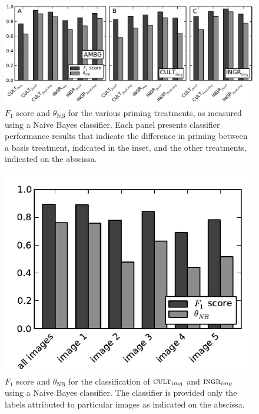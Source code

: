 \documentclass[a4paper]{report}
\begin{document}
\begin{figure}
	\includegraphics{figs/f1-thetas.pdf}
	\caption{ $F_1$ score and $\theta_\text{NB}$ for the various 
priming treatments, as measured using a Naive Bayes classifier. Each panel 
presents classifier performance results that indicate the difference in
priming between a basis 
treatment, indicated in the inset, and the other treatments, indicated on the
abscissa. }
\end{figure}

\begin{figure}
	\includegraphics{figs/longitudinalF1scores-t1-t2.pdf}
	\caption{ $F_1$ score and $\theta_\text{NB}$ for the classification of 
	$\textsc{cult}_{img}$ and $\textsc{ingr}_{img}$ using a Naive Bayes 
	classifier.  The classifier is provided only the labels attributed to
	particular images as indicated on the abscissa.}
\end{figure}
\end{document}
